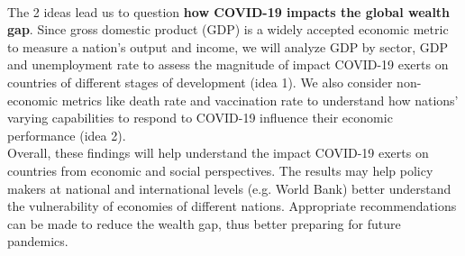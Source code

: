 \documentclass[fontsize=11pt]{article}
\begin{document}
\\
\noindent The 2 ideas lead us to question  \textbf{how COVID-19 impacts the global wealth gap}. Since gross domestic product (GDP) is a widely accepted economic metric to measure a nation’s output and income, we will analyze GDP by sector, GDP and unemployment rate to assess the magnitude of impact COVID-19 exerts on countries of different stages of development (idea 1). We also consider non-economic metrics like death rate and vaccination rate to understand how nations’ varying capabilities to respond to COVID-19 influence their economic performance (idea 2).  \\

\noindent Overall, these findings will help understand the impact COVID-19 exerts on countries from economic and social perspectives. The results may help policy makers at national and international levels (e.g. World Bank) better understand the vulnerability of economies of different nations. Appropriate recommendations can be made to reduce the wealth gap, thus better preparing for future pandemics.
\newpage
\end{document}

